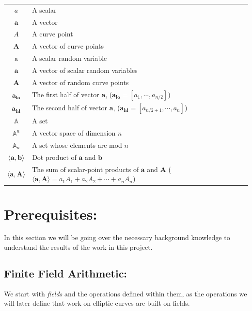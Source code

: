 \documentclass{article}
\renewcommand{\vec}[1]{\boldsymbol{#1}}
\newcommand{\ran}[1]{\text{#1}}
\newcommand{\vecran}[1]{\mathbf{#1}}
\newcommand{\dotp}[2]{\langle #1, #2 \rangle}
\newcommand{\opn}[1]{\operatorname{#1}}
\newcommand{\veclo}[1]{\vec{#1_{\opn{lo}}}}
\newcommand{\vechi}[1]{\vec{#1_{\opn{hi}}}}
\begin{document}
\begin{center}
\begin{tabular}{ c l }
	$a$                       & A scalar \\
	$\vec{a}$                 & A vector \\
	$A$                       & A curve point \\
	$\vec{A}$                 & A vector of curve points \\
	$\ran{a}$                 & A scalar random variable \\
	$\vecran{a}$              & A vector of scalar random variables \\
	$\vecran{A}$              & A vector of random curve points \\
	$\veclo{a}$               & The first half of vector $\vec{a}$, ($\veclo{a} = [a_{1}, \cdots, a_{n/2}]$) \\
	$\vechi{a}$               & The second half of vector $\vec{a}$, ($\vechi{a} = [a_{n/2+1}, \cdots, a_{n}]$) \\
	$\mathbb{A}$              & A set \\
	$\mathbb{A}^n$            & A vector space of dimension $n$ \\ 
	$\mathbb{A}_n$            & A set whose elements are mod $n$ \\ 
	$\dotp{\vec{a}}{\vec{b}}$ & Dot product of $\vec{a}$ and $\vec{b}$ \\
	$\dotp{\vec{a}}{\vec{A}}$ & The sum of scalar-point products of $\vec{a}$ and $\vec{A}$ ($\dotp{\vec{a}}{\vec{A}} = a_1 A_1 + a_2 A_2 + \cdots + a_n A_n$) \\
\end{tabular}
\end{center}

\section{Prerequisites:}

In this section we will be going over the necessary background knowledge
to understand the results of the work in this project.

\subsection{Finite Field Arithmetic:} \label{Finite Field Arithmetic}

We start with \textit{fields} and the operations defined within
them, as the operations we will later define that work on elliptic
curves are built on fields.
\end{document}
